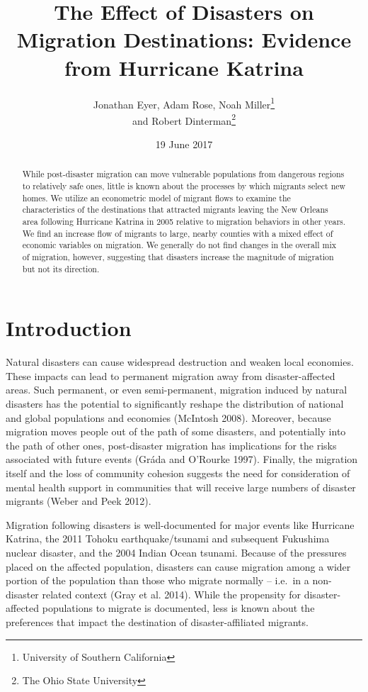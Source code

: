 \documentclass[]{article}
\title{The Effect of Disasters on Migration Destinations: Evidence from
Hurricane Katrina}
\author{Jonathan Eyer, Adam Rose, Noah Miller\footnote{University of Southern
  California} \\ and Robert Dinterman\footnote{The Ohio State University}}
\date{19 June 2017}
\begin{document}
\maketitle
\begin{abstract}
While post-disaster migration can move vulnerable populations from
dangerous regions to relatively safe ones, little is known about the
processes by which migrants select new homes. We utilize an econometric
model of migrant flows to examine the characteristics of the
destinations that attracted migrants leaving the New Orleans area
following Hurricane Katrina in 2005 relative to migration behaviors in
other years. We find an increase flow of migrants to large, nearby
counties with a mixed effect of economic variables on migration. We
generally do not find changes in the overall mix of migration, however,
suggesting that disasters increase the magnitude of migration but not
its direction.
\end{abstract}

\newpage

\section{Introduction}\label{introduction}

Natural disasters can cause widespread destruction and weaken local
economies. These impacts can lead to permanent migration away from
disaster-affected areas. Such permanent, or even semi-permanent,
migration induced by natural disasters has the potential to
significantly reshape the distribution of national and global
populations and economies (McIntosh 2008). Moreover, because migration
moves people out of the path of some disasters, and potentially into the
path of other ones, post-disaster migration has implications for the
risks associated with future events (Gráda and O'Rourke 1997). Finally,
the migration itself and the loss of community cohesion suggests the
need for consideration of mental health support in communities that will
receive large numbers of disaster migrants (Weber and Peek 2012).

Migration following disasters is well-documented for major events like
Hurricane Katrina, the 2011 Tohoku earthquake/tsunami and subsequent
Fukushima nuclear disaster, and the 2004 Indian Ocean tsunami. Because
of the pressures placed on the affected population, disasters can cause
migration among a wider portion of the population than those who migrate
normally -- i.e.~in a non-disaster related context (Gray et al. 2014).
While the propensity for disaster-affected populations to migrate is
documented, less is known about the preferences that impact the
destination of disaster-affiliated migrants.
\end{document}

